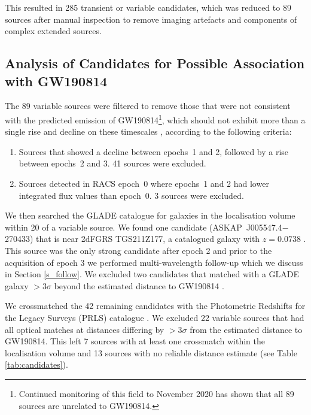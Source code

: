 This resulted in 285 transient or variable candidates, which was reduced to 89 sources after manual inspection to remove imaging artefacts and components of complex extended sources.


\subsection{Analysis of Candidates for Possible Association with GW190814}
The 89 variable sources were filtered to remove those that were not consistent with the predicted emission of GW190814\footnote{Continued monitoring of this field to November 2020 has shown that all 89 sources are unrelated to GW190814.}, which should not exhibit more than a single rise and decline on these timescales \citep{2016ApJ...831..190H}, according to the following criteria:
\begin{enumerate}
    \item Sources that showed a decline between epochs~1 and 2, followed by a rise between epochs~2 and 3. 41 sources were excluded.
    \item Sources detected in RACS epoch~0 where epochs~1 and 2 had lower integrated flux values than epoch~0. 3 sources were excluded.
\end{enumerate}

We then searched the GLADE catalogue \citep[GLADE;][]{2018MNRAS.479.2374D} for galaxies in the localisation volume within 20\arcsec \citep[or $\sim 20$\,kpc at the estimated distance of GW190814][]{GCN25333} of a variable source. We found one candidate (ASKAP~J005547.4$-$270433) that is near 2dFGRS TGS211Z177, a catalogued galaxy with $z=0.0738$ \citep{2001MNRAS.328.1039C}. This source was the only strong candidate after epoch 2 and prior to the acquisition of epoch 3 we performed multi-wavelength follow-up which we discuss in Section \ref{s_follow}. We excluded two candidates that matched with a GLADE galaxy $>3\sigma$ beyond the estimated distance to GW190814 \citep[$267 \pm 52$\,Mpc][]{GCN25333}.

We crossmatched the 42 remaining candidates with the Photometric Redshifts for the Legacy Surveys (PRLS) catalogue \citep{2019AJ....157..168D,2020arXiv200106018Z}. We excluded 22 variable sources that had all optical matches at distances differing by $>3\sigma$ from the estimated distance to GW190814. This left 7 sources with at least one crossmatch within the localisation volume and 13 sources with no reliable distance estimate (see Table \ref{tab:candidates}).



